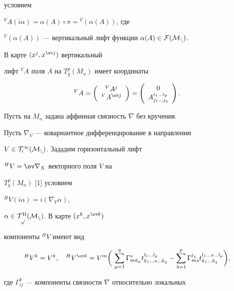 условием 


${}^V A (i\alpha) = \alpha(A) \circ \pi = {}^V(\alpha(A))$, где


${}^V(\alpha(A))$ --- вертикальный лифт функции $\alpha(A) \in \cal F(M_n)$. 


В карте $(x^j, x^{\ov j})$ вертикальный 


лифт ${}^V A$ поля $A$ на $T^p_q(M_n)$ имеет координаты


$$


{}^V A =


\left( \begin{array}{c} {}^V A^j \\ {}^V A^{\ov j} \end{array} \right)=


\left( \begin{array}{c} 0 \\ A^{i_1 \dotsc i_p}_{j_1 \dotsc j_q}


\end{array} \right).


$$





Пусть на $M_n$ задана аффинная связность $\nabla$ без кручения. 


Пусть $\nabla_V$ --- ковариантное дифференцирование в направлении 


$V \in \cal T^1_0(M_n)$. Зададим горизонтальный лифт 


${}^H V = \ov \nabla_X$ векторного поля $V$ на 


$T^p_q(M_n)$ [1] условием


${}^H V (i \alpha) = i(\nabla_V \alpha)$,


$\alpha \in \cal T^q_p(M_n)$. В карте $(x^k, x^{\ov k})$ 


компоненты ${}^H V$ имеют вид


$$


{}^H V^k = V^k, \quad 


{}^H V^{\ov k} = 


V^m\bigg(\,


\sum_{\mu=1}^q\Gamma^s_{m k_\mu}t^{l_1\dotsc l_p}_{k_1\dotsc s \dotsc k_q}-


\sum_{\lambda=1}^p \Gamma^{l_\lambda}_{m s}


t^{l_1 \dotsc s \dotsc l_p}_{k_1 \dotsc k_q}\bigg),


$$


где $\Gamma^k_{ij}$ --- компоненты связности $\nabla$ относительно локальных 


